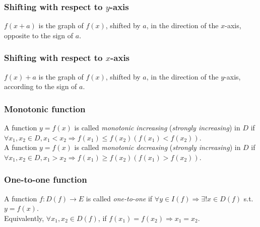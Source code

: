 \documentclass[]{article}
\begin{document}
\subsubsection{Shifting with respect to $y$-axis}
$f(x+a)$ is the graph of $f(x)$, shifted by $a$, in the direction of the $x$-axis, opposite to the sign of $a$. \\

\subsubsection{Shifting with respect to $x$-axis}
$f(x) + a$ is the graph of $f(x)$, shifted by $a$, in the direction of the $y$-axis, according to the sign of $a$. \\

\subsubsection{Monotonic function}

A function $y = f(x)$ is called \emph{monotonic increasing} (\emph{strongly increasing}) in $D$ if $\forall x_1, x_2 \in D, x_1 < x_2 \Rightarrow f(x_1) \leq f(x_2) (f(x_1) < f(x_2))$. \\
A function $y = f(x)$ is called \emph{monotonic decreasing} (\emph{strongly increasing}) in $D$ if $\forall x_1, x_2 \in D, x_1 > x_2 \Rightarrow f(x_1) \geq f(x_2) (f(x_1) > f(x_2))$. \\

\subsubsection{One-to-one function}

A function $f : D(f) \rightarrow E$ is called \emph{one-to-one} if $\forall y \in I(f) \Rightarrow \exists ! x \in D(f)$ s.t. $y = f(x)$. \\
Equivalently, $\forall x_1, x_2 \in D(f)$, if $f(x_1) = f(x_2) \Rightarrow x_1 = x_2$.\\
\end{document}
